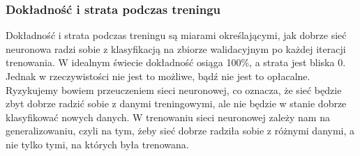 \subsubsection{Dokładność i strata podczas treningu}\label{subsubsec:dokladnosc_i_strata_podczas_treningu}
Dokładność i strata podczas treningu są miarami określającymi, jak dobrze sieć neuronowa radzi sobie z klasyfikacją na zbiorze walidacyjnym po każdej iteracji trenowania.
W idealnym świecie dokładność osiąga 100\%, a strata jest bliska 0. Jednak w rzeczywistości nie jest to możliwe, bądź nie jest to opłacalne.
Ryzykujemy bowiem przeuczeniem sieci neuronowej, co oznacza, że sieć będzie zbyt dobrze radzić sobie z danymi treningowymi, ale nie będzie w stanie dobrze klasyfikować nowych danych.
W trenowaniu sieci neuronowej zależy nam na generalizowaniu, czyli na tym, żeby sieć dobrze radziła sobie z różnymi danymi, a nie tylko tymi, na których była trenowana.
